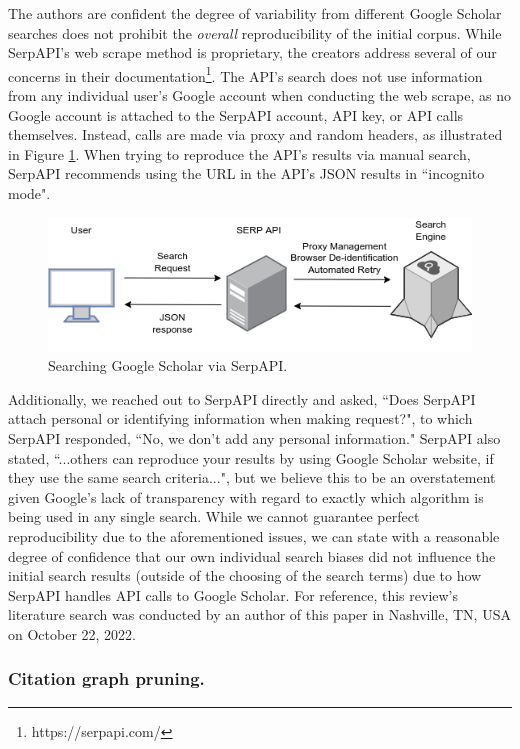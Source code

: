 \documentclass[manuscript,screen,review]{acmart}
\begin{document}
The authors are confident the degree of variability from different Google Scholar searches does not prohibit the \textit{overall} reproducibility of the initial corpus. While SerpAPI's web scrape method is proprietary, the creators address several of our concerns in their documentation\footnote{https://serpapi.com/}. The API's search does not use information from any individual user's Google account when conducting the web scrape, as no Google account is attached to the SerpAPI account, API key, or API calls themselves. Instead, calls are made via proxy and random headers, as illustrated in Figure \ref{fig:serpAPI}. When trying to reproduce the API's results via manual search, SerpAPI recommends using the URL in the API's JSON results in ``incognito mode". 

\begin{figure}
    \includegraphics[width=\textwidth]{img/SERP_API_diagram.drawio.png}
    \caption{Searching Google Scholar via SerpAPI.}
    \label{fig:serpAPI}
\end{figure}

Additionally, we reached out to SerpAPI directly and asked, ``Does SerpAPI attach personal or identifying information when making request?", to which SerpAPI responded, ``No, we don't add any personal information." SerpAPI also stated, ``...others can reproduce your results by using Google Scholar website, if they use the same search criteria...", but we believe this to be an overstatement given Google's lack of transparency with regard to exactly which algorithm is being used in any single search. While we cannot guarantee perfect reproducibility due to the aforementioned issues, we can state with a reasonable degree of confidence that our own individual search biases did not influence the initial search results (outside of the choosing of the search terms) due to how SerpAPI handles API calls to Google Scholar. For reference, this review's literature search was conducted by an author of this paper in Nashville, TN, USA on October 22, 2022.

\subsubsection{Citation graph pruning.} 
\end{document}
